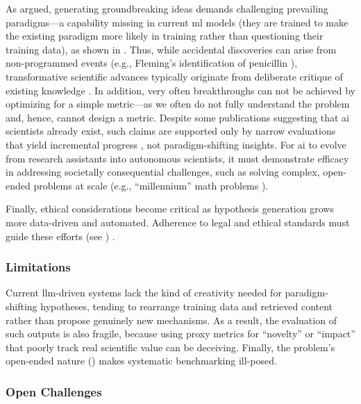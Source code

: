As \textcite{Kuhn1962Structure} argued, generating groundbreaking ideas demands challenging prevailing paradigms---a capability missing in current \gls{ml} models (they are trained to make the existing paradigm more likely in training rather than questioning their training data), as shown in . 
Thus, while accidental discoveries can arise from non-programmed events (e.g., Fleming’s identification of penicillin \autocite{Fleming1929antibacterial, Fleming1945penicillin}), transformative scientific advances typically originate from deliberate critique of existing knowledge \autocite{popper1959logic, Lakatos1970falsification}. In addition, very often breakthroughs can not be achieved by optimizing for a simple metric---as we often do not fully understand the problem and, hence, cannot design a metric.\autocite{stanley2015greatness}
Despite some publications suggesting that \gls{ai} scientists already exist, such claims are supported only by narrow evaluations that yield incremental progress \autocite{novikov2025alphaevolve}, not paradigm-shifting insights. For \gls{ai} to evolve from research assistants into autonomous scientists, it must demonstrate efficacy in addressing societally consequential challenges, such as solving complex, open-ended problems at scale (e.g., \enquote{millennium} math problems
\autocite{Carlson2006millennium}).

Finally, ethical considerations become critical as hypothesis generation grows more data-driven and automated. Adherence to legal and ethical standards must guide these efforts (see ) \autocite{danish_gov2024hypothesis}.


\subsubsection{Limitations}

Current \gls{llm}-driven systems lack the kind of creativity needed for paradigm-shifting hypotheses, tending to rearrange training data and retrieved content rather than propose genuinely new mechanisms. As a result, the evaluation of such outputs is also fragile, because using proxy metrics for \enquote{novelty} or \enquote{impact} that poorly track real scientific value can be deceiving. Finally, the problem’s open-ended nature () makes systematic benchmarking ill-posed.


\subsubsection{Open Challenges}

